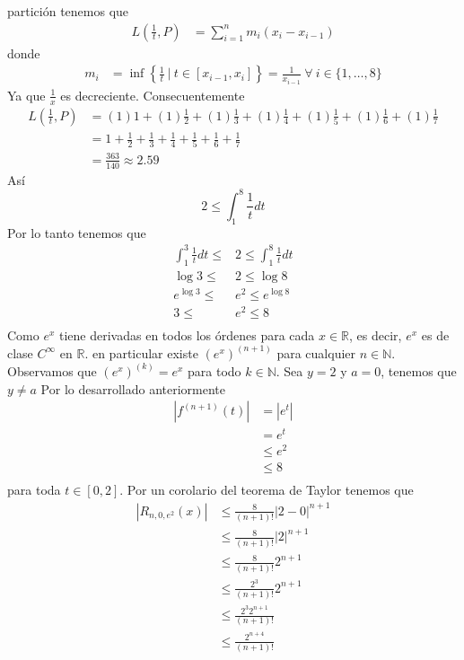 \documentclass[a4paper]{article}
\begin{document}
partición tenemos que 
\begin{align*}
    L\left(\frac{1}{t}, P\right) &= \sum_{i=1}^{n}m_{i}(x_{i} - x_{i - 1})
\end{align*}
donde 
\begin{align*}
    m_{i} &= \inf \left\{ \frac{1}{t} \ | \ t \in [x_{i - 1}, x_{i} ]  \right\} = \frac{1}{x_{i-1}} \ \forall \ i \in \{1, \dotsc, 8\}
\end{align*}
Ya que \(\frac{1}{x}\) es decreciente. Consecuentemente
\begin{align*}
    L\left(\frac{1}{t}, P\right) &= (1)1 + (1)\frac{1}{2} + (1)\frac{1}{3} + (1)\frac{1}{4} + (1)\frac{1}{5} + (1)\frac{1}{6} + (1)\frac{1}{7} \\
    &= 1 + \frac{1}{2} + \frac{1}{3} + \frac{1}{4} + \frac{1}{5} + \frac{1}{6} + \frac{1}{7} \\
    &= \frac{363}{140} \approx 2{.}59
\end{align*}
Así 
\[
    2 \leq \int_{1}^{8} \frac{1}{t} dt  
\]
Por lo tanto tenemos que 
\begin{align*}
    \int_{1}^{3} \frac{1}{t} dt \leq &2 \leq \int_{1}^{8} \frac{1}{t} dt \\
    \log{3} \leq &2 \leq \log{8} \\
    e^{\log{3}} \leq &e^{2} \leq e^{\log{8}} \\
    3 \leq &e^{2} \leq 8  \\
\end{align*}
Como \(e^{x}\) tiene derivadas en todos los órdenes para cada 
\(x \in \mathbb{R}\), es decir, \(e^{x}\) es de clase \(C^{\infty}\) en \(\mathbb{R}\).
en particular existe \(\left(e^{x}\right)^{(n + 1)}\) para cualquier \(n \in \mathbb{N}\).
Observamos que \(\left(e^{x}\right)^{(k)} = e^{x}\) para todo \(k \in \mathbb{N}\).
\newline 
Sea \(y = 2\) y \(a = 0\), tenemos que \(y \neq a\)
Por lo desarrollado anteriormente
\begin{align*}
    |f^{(n + 1)}(t)| &= |e^{t}| \\
                     &= e^{t} \\
                     &\leq e^{2} \\
                     &\leq 8 \\
\end{align*}
para toda \(t \in [0, 2]\).
\newline 
Por un corolario del teorema de Taylor tenemos que 
\begin{align*}
    |R_{n, 0, e^{2}}(x)| &\leq \frac{8}{(n + 1)!}|2 - 0|^{n+1} \\
                         &\leq \frac{8}{(n + 1)!}|2|^{n+1} \\
                         &\leq \frac{8}{(n + 1)!}2^{n+1} \\
                         &\leq \frac{2^{3}}{(n + 1)!}2^{n+1} \\
                         &\leq \frac{2^{3}2^{n+1}}{(n + 1)!} \\
                         &\leq \frac{2^{n+4}}{(n + 1)!} \\
\end{align*}
\end{document}
